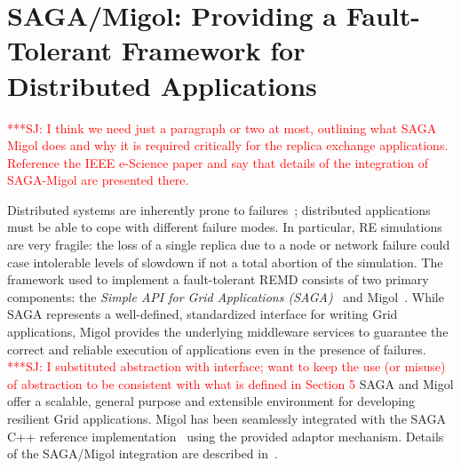 \documentclass{rspublic}
\newcommand{\jhanote}[1]{ {\textcolor{red} { ***SJ: #1 }}}
\newcommand{\jhanote}[1]{}
\begin{document}
\section{SAGA/Migol: Providing a Fault-Tolerant Framework for
  Distributed Applications}\label{sec:sagamigol}

\jhanote{I think we need just a paragraph or two at most, outlining
  what SAGA Migol does and why it is required critically for the
  replica exchange applications. Reference the IEEE e-Science paper
  and say that details of the integration of SAGA-Migol are presented
  there.}


Distributed systems are inherently prone to
failures~\citep{schroeder,10.1109/E-SCIENCE.2006.93}; distributed
applications must be able to cope with different failure modes.  In
particular, RE simulations are very fragile: the loss of a single
replica due to a node or network failure could case intolerable levels
of slowdown if not a total abortion of the simulation.  The framework
used to implement a fault-tolerant REMD consists of two primary
components: the \textit{Simple API for Grid Applications
  (SAGA)}~\citep{saga_gfd90} and Migol~\citep{schnorLuckow08}.  While
SAGA represents a well-defined, standardized interface for writing
Grid applications, Migol provides the underlying middleware services
to guarantee the correct and reliable exe\-cution of applications even
in the presence of failures. \jhanote{I substituted abstraction with
  interface; want to keep the use (or misuse) of abstraction to be
  consistent with what is defined in Section 5} SAGA and Migol offer a
scalable, general purpose and extensible environment for developing
resilient Grid applications.  Migol has been seamlessly integrated
with the SAGA C++ reference implementation~\citep{Kaiser:2006qp} using
the provided adaptor mechanism. Details of the SAGA/Migol integration
are described in~\citet{Luckow:2008la}.
\end{document}
